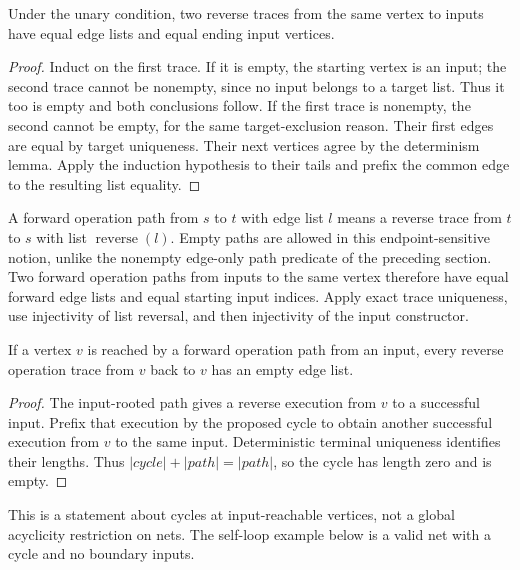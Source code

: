 \begin{theorem}
Under the unary condition, two reverse traces from the same vertex to inputs
have equal edge lists and equal ending input vertices.
\end{theorem}
\begin{proof}
Induct on the first trace. If it is empty, the starting vertex is an input;
the second trace cannot be nonempty, since no input belongs to a target list.
Thus it too is empty and both conclusions follow. If the first trace is
nonempty, the second cannot be empty, for the same target-exclusion reason.
Their first edges are equal by target uniqueness. Their next vertices agree by
the determinism lemma. Apply the induction hypothesis to their tails and prefix
the common edge to the resulting list equality.
\end{proof}
A forward operation path from $s$ to $t$ with edge list $l$ means a reverse trace
from $t$ to $s$ with list $\operatorname{reverse}(l)$. Empty paths are allowed in
this endpoint-sensitive notion, unlike the nonempty edge-only path predicate of
the preceding section.
Two forward operation paths from inputs to the same vertex therefore have equal
forward edge lists and equal starting input indices. Apply exact trace uniqueness,
use injectivity of list reversal, and then injectivity of the input constructor.

\begin{theorem}
If a vertex $v$ is reached by a forward operation path from an input, every
reverse operation trace from $v$ back to $v$ has an empty edge list.
\end{theorem}
\begin{proof}
The input-rooted path gives a reverse execution from $v$ to a successful input.
Prefix that execution by the proposed cycle to obtain another successful
execution from $v$ to the same input. Deterministic terminal uniqueness identifies
their lengths. Thus $|\mathit{cycle}|+|\mathit{path}|=|\mathit{path}|$, so the
cycle has length zero and is empty.
\end{proof}
This is a statement about cycles at input-reachable vertices, not a global
acyclicity restriction on nets. The self-loop example below is a valid net with
a cycle and no boundary inputs.
